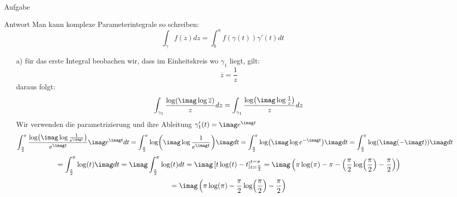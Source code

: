 \documentclass{scrartcl}
\begin{document}
\begin{section}{Aufgabe}
\begin{subsection}{Antwort}
    Man kann komplexe Parameterintegrale so schreiben: 
    \[\int_{\gamma}f(z)dz=\int_{b}^a f(\gamma(t))\gamma'(t) dt\]
\begin{itemize}
\item[a)]
    für das erste Integral beobachen wir, dass im Einheitskreis wo $\gamma_1$ liegt, gilt:
    \[\overline{z}=\frac{1}{z}\]
     daraus folgt:
     \[\int_{\gamma_1} \frac{\log(\imag \log \overline z)}{z} dz 
     =\int_{\gamma_1} \frac{\log(\imag \log \frac{1}{z})}{z} dz \]
     Wir verwenden die parametrizierung und ihre Ableitung $\gamma_1'(t)=\imag e^{\imag t}$
      \[\int_{\frac{\pi}{2}}^\pi \frac{\log(\imag \log \frac{1}{e^{\imag t}})}{e^{\imag t}} \imag e^{\imag t} dt 
      =\int_{\frac{\pi}{2}}^\pi \log(\imag \log \frac{1}{e^{\imag t}}) \imag dt 
      =\int_{\frac{\pi}{2}}^\pi \log(\imag \log e^{-\imag t}) \imag dt 
      =\int_{\frac{\pi}{2}}^\pi \log(\imag( -\imag t)) \imag dt 
      \]
      \[=\int_{\frac{\pi}{2}}^\pi \log(t) \imag dt
      = \imag\int_{\frac{\pi}{2}}^\pi \log(t) dt =\imag\left[t \log(t)-t\right]_{t=\frac{\pi}{2}}^{t=\pi}
      =\imag \left(\pi \log(\pi)-\pi-\left(\frac{\pi}{2} \log(\frac{\pi}{2})-\frac{\pi}{2}\right)\right)\]
      \[=\imag \left(\pi \log(\pi)-\frac{\pi}{2} \log(\frac{\pi}{2}) -\frac{\pi}{2}\right)
\]
\end{itemize}
\end{subsection}
\end{section}
\end{document}
